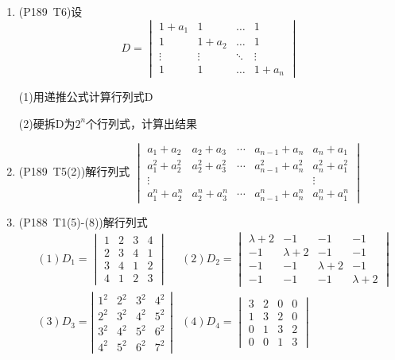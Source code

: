 \begin{enumerate}
    \item (P189\ T6)设
    $$
    D=\begin{vmatrix}
    1+a_1&1&\ldots&1\\
    1&1+a_2&\ldots&1\\
    \vdots&\vdots&\ddots&\vdots\\
    1&1&\ldots&1+a_n
    \end{vmatrix}
    $$
    
    (1)用递推公式计算行列式D
    
    (2)硬拆D为$2^n$个行列式，计算出结果
    
    \item (P189\ T5(2))解行列式
    $\begin{vmatrix}
    a_{1}+a_{2} & a_{2}+a_{3} & \cdots & a_{n-1}+a_{n} & a_{n}+a_{1} \\
    a_{1}^{2}+a_{2}^{2} & a_{2}^{2}+a_{3}^{2} & \cdots & a_{n-1}^{2}+a_{n}^{2} & a_{n}^{2}+a_{1}^{2} \\
    \vdots & & & & \vdots \\
    a_{1}^{n}+a_{2}^{n} & a_{2}^{n}+a_{3}^{n} & \cdots & a_{n-1}^{n}+a_{n}^{n} & a_{n}^{n}+a_{1}^{n}
    \end{vmatrix}$
    
    \item (P188\ T1(5)-(8))解行列式
    $$\begin{aligned}
    &(1)D_1=\begin{vmatrix}
    1&2&3&4\\2&3&4&1\\3&4&1&2\\4&1&2&3
    \end{vmatrix}
    &(2)D_2=\begin{vmatrix}
    \lambda+2&-1&-1&-1\\
    -1&\lambda+2&-1&-1\\
    -1&-1&\lambda+2&-1\\
    -1&-1&-1&\lambda+2
    \end{vmatrix}\\
    &(3)D_3=\left|\begin{array}{cccc}
    1^{2} & 2^{2} & 3^{2} & 4^{2} \\
    2^{2} & 3^{2} & 4^{2} & 5^{2} \\
    3^{2} & 4^{2} & 5^{2} & 6^{2} \\
    4^{2} & 5^{2} & 6^{2} & 7^{2} 
    \end{array}\right|
    &(4)D_4=\begin{vmatrix}
    3&2&0&0\\
    1&3&2&0\\
    0&1&3&2\\
    0&0&1&3
    \end{vmatrix}
    \end{aligned}$$
    

\end{enumerate}
